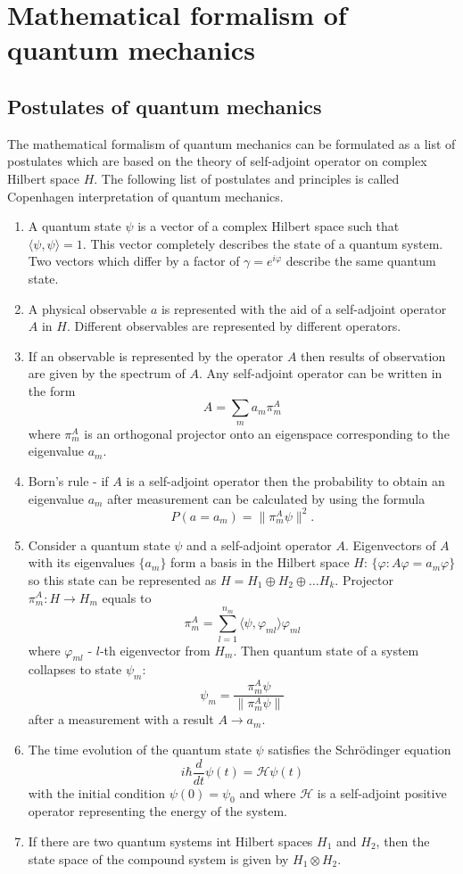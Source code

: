 \documentclass[11pt]{article}
\begin{document}
\section{Mathematical formalism of quantum mechanics}
\subsection{Postulates of quantum mechanics }
The mathematical formalism of quantum mechanics can be formulated as a list of postulates \cite{Khrennikov_information} which are based on the theory of self-adjoint operator on complex Hilbert space $H$. The following list of postulates and principles is called Copenhagen interpretation of quantum mechanics.
\begin{enumerate}[label=\bfseries Postulate \arabic*:, align=left]
  \item A quantum state $\psi$ is a vector of a complex Hilbert space such that $\langle\psi, \psi\rangle = 1$. This vector completely describes the state of a quantum system. Two vectors which differ by a factor of $\gamma = e^{i\varphi}$ describe the same quantum state.
  \item A physical observable $a$ is represented with the aid of a self-adjoint operator $A$ in $H$. Different observables are represented by different operators.
  \item If an observable is represented by the operator $A$ then results of observation are given by the spectrum of $A$. Any self-adjoint operator can be written in the form 
  \[
  A = \sum_m a_m\pi_m^A
  \]
    where $\pi_m^A$ is an orthogonal projector onto an eigenspace corresponding to the eigenvalue $a_m$.
  \item Born's rule - if $A$ is a self-adjoint operator then the probability to obtain an eigenvalue $a_m$ after measurement can be calculated by using the formula
  \[
  P(a = a_m) = \| \pi_m^A\psi\|^2.
  \]
  \item 
  Consider a quantum state $\psi$ and a self-adjoint operator $A$. Eigenvectors of $A$ with its eigenvalues $\{a_m\}$ form a basis in the Hilbert space $H$: $\{ \varphi: A\varphi = a_m\varphi\}$ so this state can be represented as $H = H_1\oplus H_2\oplus\ldots H_k$. Projector $\pi_m^A: H\to H_m$ equals to 
  \[
  \pi_m^A = \sum_{l = 1}^{n_m}\langle\psi,\varphi_{ml}\rangle\varphi_{ml}
  \]
  where $\varphi_{ml}$ - $l$-th eigenvector from $H_m$.
  Then quantum state of a system collapses to state $\psi_m$:
  \[
  \psi_m = \frac{\pi_m^A\psi}{ \| \pi_m^A\psi\|}
  \] 
  after a measurement with a result $A \to a_m$.
  \item The time evolution of the quantum state $\psi$ satisfies the Schr\"{o}dinger equation
  \[
  i\hbar \dfrac{d}{dt}\psi(t) = \mathcal{\mathcal{H}}\psi(t)
  \] 
  with the initial condition $\psi(0) = \psi_0$ and
  where $\mathcal{H}$ is a self-adjoint positive operator representing the energy of the system.
  \item If there are two quantum systems int Hilbert spaces $H_1$ and $H_2$, then the state space of the compound system is given by $H_1 \otimes H_2$.  
\end{enumerate}
\end{document}
